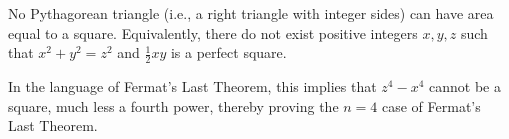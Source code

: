 No Pythagorean triangle (i.e., a right triangle with integer sides) can have area equal to a square. Equivalently, there do not exist positive integers $x, y, z$ such that $x^2 + y^2 = z^2$ and $\frac{1}{2}xy$ is a perfect square.

In the language of Fermat's Last Theorem, this implies that $z^4 - x^4$ cannot be a square, much less a fourth power, thereby proving the $n = 4$ case of Fermat's Last Theorem.
